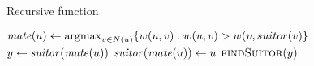 \begin{algorithm}[tb]
\caption{Recursive \findsuitor function}
\label{algo:rec-find-suitor}
\begin{algorithmic}[1]
\State$\mate(u) \gets \argmax_{v \in N(u)}\set{w(u, v) : w(u, v) > w(v, suitor(v)}$
\State$y \gets \mathit{suitor}(\mathit{mate}(u))$
\State$\mathit{suitor}(\mathit{mate}(u)) \gets u$
\State$\textsc{findSuitor}(y)$
\EndIf
\EndIf
\EndFunction
\end{algorithmic}
\end{algorithm}
